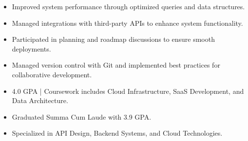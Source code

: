 \par\smallskip
\noindent
\begin{minipage}{20cm}
  \begin{minipage}{9.75cm}
    \begin{itemize}
      \item Improved system performance through optimized queries and data structures.
      \item Managed integrations with third-party APIs to enhance system functionality.
    \end{itemize}
  \end{minipage}
  \hfill
  \begin{minipage}{9.75cm}
    \begin{itemize}
      \item Participated in planning and roadmap discussions to ensure smooth deployments.
      \item Managed version control with Git and implemented best practices for collaborative development.
    \end{itemize}
  \end{minipage}
\end{minipage}
\par\smallskip
\divider

\begin{itemize}
  \item 4.0 GPA | Coursework includes Cloud Infrastructure, SaaS Development, and Data Architecture.
\end{itemize}
\divider

\begin{itemize}
  \item Graduated Summa Cum Laude with 3.9 GPA.
  \item Specialized in API Design, Backend Systems, and Cloud Technologies.
\end{itemize}

\noindent
\begin{minipage}{20cm}
\end{minipage}


